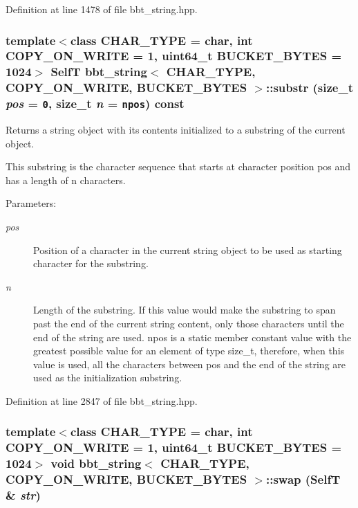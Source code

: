 Definition at line 1478 of file bbt\_\-string.hpp.\hypertarget{classbbt__string_b79ed106ffa94ed529c8697745f8d1f5}{
\subsubsection[{substr}]{\setlength{\rightskip}{0pt plus 5cm}template$<$class CHAR\_\-TYPE  = char, int COPY\_\-ON\_\-WRITE = 1, uint64\_\-t BUCKET\_\-BYTES = 1024$>$ {\bf SelfT} {\bf bbt\_\-string}$<$ CHAR\_\-TYPE, COPY\_\-ON\_\-WRITE, BUCKET\_\-BYTES $>$::substr (size\_\-t {\em pos} = {\tt 0}, \/  size\_\-t {\em n} = {\tt npos}) const}}
\label{classbbt__string_b79ed106ffa94ed529c8697745f8d1f5}


Returns a string object with its contents initialized to a substring of the current object.

This substring is the character sequence that starts at character position pos and has a length of n characters.

\begin{Desc}
\item[Parameters:]
\begin{description}
\item[{\em pos}]Position of a character in the current string object to be used as starting character for the substring. \item[{\em n}]Length of the substring. If this value would make the substring to span past the end of the current string content, only those characters until the end of the string are used. npos is a static member constant value with the greatest possible value for an element of type size\_\-t, therefore, when this value is used, all the characters between pos and the end of the string are used as the initialization substring. \end{description}
\end{Desc}


Definition at line 2847 of file bbt\_\-string.hpp.\hypertarget{classbbt__string_04e661fd40f8134bff1b427e08603786}{
\subsubsection[{swap}]{\setlength{\rightskip}{0pt plus 5cm}template$<$class CHAR\_\-TYPE  = char, int COPY\_\-ON\_\-WRITE = 1, uint64\_\-t BUCKET\_\-BYTES = 1024$>$ void {\bf bbt\_\-string}$<$ CHAR\_\-TYPE, COPY\_\-ON\_\-WRITE, BUCKET\_\-BYTES $>$::swap ({\bf SelfT} \& {\em str})}}
\label{classbbt__string_04e661fd40f8134bff1b427e08603786}


